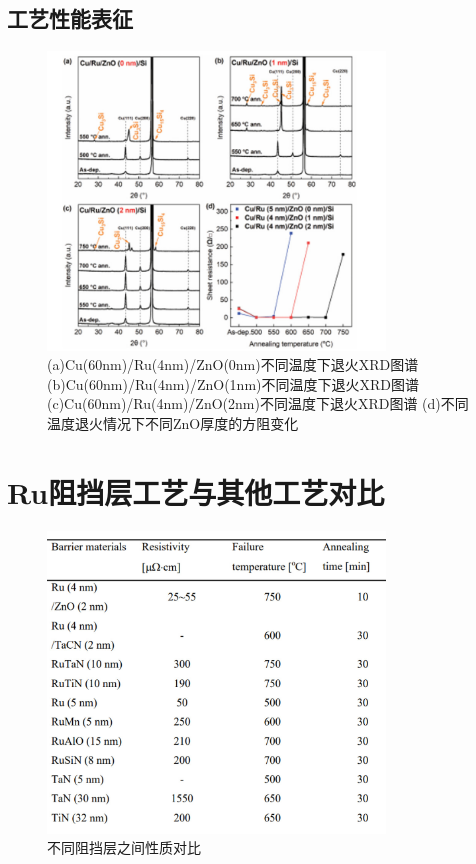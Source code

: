 \documentclass[UTF8,a4paper,12pt]{ctexart}%
\begin{document}
\subsection{工艺性能表征}


\begin{figure}[htb]
	\centering
	\includegraphics[width=0.8\textwidth]{26.jpg}
	\caption{(a)Cu(60nm)/Ru(4nm)/ZnO(0nm)不同温度下退火XRD图谱 (b)Cu(60nm)/Ru(4nm)/ZnO(1nm)不同温度下退火XRD图谱 
	(c)Cu(60nm)/Ru(4nm)/ZnO(2nm)不同温度下退火XRD图谱 (d)不同温度退火情况下不同ZnO厚度的方阻变化}
	\label{Fig:26}
\end{figure}




\section{Ru阻挡层工艺与其他工艺对比}


\begin{figure}[htb]
	\centering
	\includegraphics[width=0.8\textwidth]{25.jpg}
	\caption{不同阻挡层之间性质对比}
	\label{Fig:25}
\end{figure}
\end{document}
